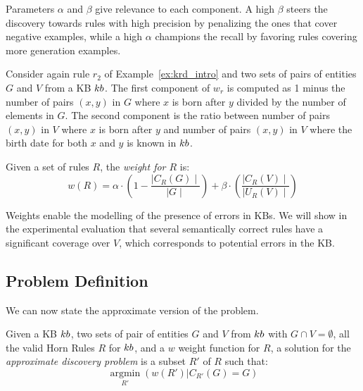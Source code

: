 Parameters $\alpha$ and $\beta$ give relevance to each component. A high $\beta$ steers the discovery towards rules with high precision by penalizing the ones that cover negative examples, %
while a high $\alpha$ champions the recall by favoring rules covering more generation examples. %

\begin{example}
	Consider again rule $r_2$ of Example~\ref{ex:krd_intro} 
	and two sets of pairs of entities $G$ and $V$ from a KB ${\sc kb}$. 
The first component of $w_r$ is computed as 1 minus the number of pairs $(x,y)$ in $G$ where
		$x$ is born after $y$ divided by the number of elements in $G$.
The second component is the ratio between number of pairs $(x,y)$ in $V$ where $x$ is born after $y$ and number of pairs $(x,y)$ in $V$ where the birth date for both $x$ and $y$ is known in ${\sc kb}$.
\end{example}

\begin{definition}
\label{def:totCost}
	Given a set of rules $R$, the {\em weight for $R$} is:
	\begin{equation*}
		w(R) = \alpha \cdot (1-\frac{\mid C_{R}(G)\mid}{\mid G \mid}) +\beta \cdot (\frac{\mid C_{R}(V) \mid}{\mid U_{R}(V)\mid})
	\end{equation*}
\end{definition}

Weights enable the modelling of the presence of errors in KBs. We will show in the experimental evaluation that several semantically correct rules have a significant coverage over $V$, which corresponds to potential errors in the KB. 

\vspace{-1ex}	
\subsection{Problem Definition} \label{sec:krd_prob_def}	
We can now state the approximate version of the problem.

\begin{definition}
	Given a KB ${\sc kb}$, two sets of pair of entities $G$ and $V$ from ${\sc kb}$ with $G \cap V = \emptyset$, all the valid Horn Rules $R$ for ${\sc kb}$, and a $w$ weight function for $R$, a solution for the \emph{approximate discovery problem} is a subset $R'$ of $R$  such that:
%
	$$\underset{R'}{\operatorname{argmin}}(w(R') | C_{R'}(G) = G)$$
\end{definition}
\vspace{-1ex}	


